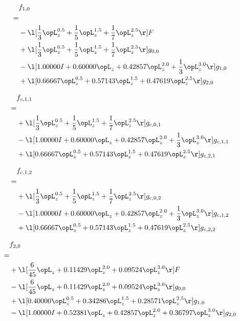 \begin{alignat}{2} 
\label{eq:f_10_0} 
& f_{1,0} \nonumber \\ 
 = \\ 
& - \l[ \frac{1}{3} \opL_z^{0.5} + \frac{1}{5} \opL_z^{1.5} + \frac{1}{7} \opL_z^{2.5}  \r] F \nonumber \\ 
& + \l[ \frac{1}{3} \opL_z^{0.5} + \frac{1}{5} \opL_z^{1.5} + \frac{1}{7} \opL_z^{2.5}  \r] g_{0,0} \nonumber \\ 
& - \l[  1.00000 I +  0.60000 \opL_z +  0.42857 \opL_z^{2.0} + \frac{1}{3} \opL_z^{3.0}  \r] g_{1,0} \nonumber \\ 
& + \l[  0.66667 \opL_z^{0.5} +  0.57143 \opL_z^{1.5} +  0.47619 \opL_z^{2.5}  \r] g_{2,0} \nonumber \\ 
\end{alignat} 


\begin{alignat}{2} 
\label{eq:f_11_0} 
& f_{c,1,1} \nonumber \\ 
 = \\ 
& + \l[ \frac{1}{3} \opL_z^{0.5} + \frac{1}{5} \opL_z^{1.5} + \frac{1}{7} \opL_z^{2.5}  \r] g_{c,0,1} \nonumber \\ 
& - \l[  1.00000 I +  0.60000 \opL_z +  0.42857 \opL_z^{2.0} + \frac{1}{3} \opL_z^{3.0}  \r] g_{c,1,1} \nonumber \\ 
& + \l[  0.66667 \opL_z^{0.5} +  0.57143 \opL_z^{1.5} +  0.47619 \opL_z^{2.5}  \r] g_{c,2,1} \nonumber \\ 
\end{alignat} 


\begin{alignat}{2} 
\label{eq:f_12_0} 
& f_{c,1,2} \nonumber \\ 
 = \\ 
& + \l[ \frac{1}{3} \opL_z^{0.5} + \frac{1}{5} \opL_z^{1.5} + \frac{1}{7} \opL_z^{2.5}  \r] g_{c,0,2} \nonumber \\ 
& - \l[  1.00000 I +  0.60000 \opL_z +  0.42857 \opL_z^{2.0} + \frac{1}{3} \opL_z^{3.0}  \r] g_{c,1,2} \nonumber \\ 
& + \l[  0.66667 \opL_z^{0.5} +  0.57143 \opL_z^{1.5} +  0.47619 \opL_z^{2.5}  \r] g_{c,2,2} \nonumber \\ 
\end{alignat} 


\begin{alignat}{2} 
\label{eq:f_20_0} 
& f_{2,0} \nonumber \\ 
 = \\ 
& + \l[ \frac{6}{45} \opL_z +  0.11429 \opL_z^{2.0} +  0.09524 \opL_z^{3.0}  \r] F \nonumber \\ 
& - \l[ \frac{6}{45} \opL_z +  0.11429 \opL_z^{2.0} +  0.09524 \opL_z^{3.0}  \r] g_{0,0} \nonumber \\ 
& + \l[  0.40000 \opL_z^{0.5} +  0.34286 \opL_z^{1.5} +  0.28571 \opL_z^{2.5}  \r] g_{1,0} \nonumber \\ 
& - \l[  1.00000 I +  0.52381 \opL_z +  0.42857 \opL_z^{2.0} +  0.36797 \opL_z^{3.0}  \r] g_{2,0} \nonumber \\ 
\end{alignat} 


